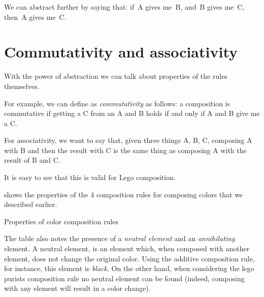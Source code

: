We can abstract further by saying that: if~A gives me~B, and~B gives me~C, then~A gives me~C.


\section{Commutativity and associativity}

With the power of abstraction we can talk about properties of the rules themselves.

For example, we can define as \emph{commutativity} as follows: a composition is commutative if getting a C from an A and B holds if and only if A and B give me a C.


For associativity, we want to say that, given three things A, B, C, composing A with B and then the result with C is the same thing as composing A with the result of B and C.


It is easy to see that this is valid for Lego composition.



 shows the properties of the 4 composition rules for composing colors that we described earlier.

\begin{table*}[p]
    \caption{Properties of color composition rules}
    \label{tab:color-properties}
\end{table*}

The table also notes the presence of a \emph{neutral element} and an \emph{annihilating} element.
A neutral element, is an element which, when composed with another element, does not change the original color.
Using the additive composition rule, for instance, this element is \emph{black}.
On the other hand, when considering the lego purists composition rule no neutral element can be found (indeed, composing with any element will result in a color change).

